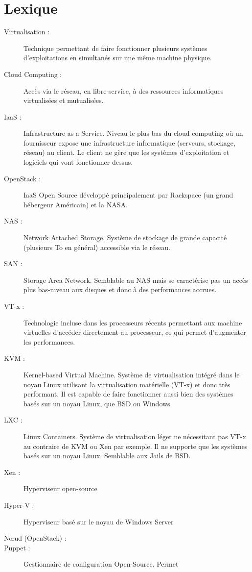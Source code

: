 \documentclass{report}
\begin{document}
\section{Lexique}
\begin{description}
\item[Virtualisation :] Technique permettant de faire fonctionner plusieurs systèmes d'exploitations en simultanés sur une même machine physique.

\item[Cloud Computing :] Accès via le réseau, en libre-service, à des ressources informatiques virtualisées et mutualisées.

\item[IaaS :] Infrastructure as a Service. Niveau le plus bas du cloud computing où un fournisseur expose une infrastructure informatique (serveurs, stockage, réseau) au client. Le client ne gère que les systèmes d'exploitation et logiciels qui vont fonctionner dessus.

\item[OpenStack :] IaaS Open Source développé principalement par Rackspace (un grand hébergeur Américain) et la NASA.

\item[NAS :] Network Attached Storage. Système de stockage de grande capacité (plusieurs To en général) accessible via le réseau.

\item[SAN :] Storage Area Network. Semblable au NAS mais se caractérise pas un accès plus bas-niveau aux disques et donc à des performances accrues.

\item[VT-x :] Technologie incluse dans les processeurs récents permettant aux machine virtuelles d'accéder directement au processeur, ce qui permet d'augmenter les performances.

\item[KVM :] Kernel-based Virtual Machine. Système de virtualisation intégré dans le noyau Linux utilisant la virtualisation matérielle (VT-x) et donc très performant. Il est capable de faire fonctionner aussi bien des systèmes basés sur un noyau Linux, que BSD ou Windows.

\item[LXC :] Linux Containers. Système de virtualisation léger ne nécessitant pas VT-x au contraire de KVM ou Xen par exemple. Il ne supporte que les systèmes basés sur un noyau Linux. Semblable aux Jails de BSD.

\item[Xen :] Hyperviseur open-source

\item[Hyper-V :] Hyperviseur basé sur le noyau de Windows Server

\item[Nœud (OpenStack) :]

\item[Puppet :] Gestionnaire de configuration Open-Source. Permet
\end{description}
 
\end{document}
